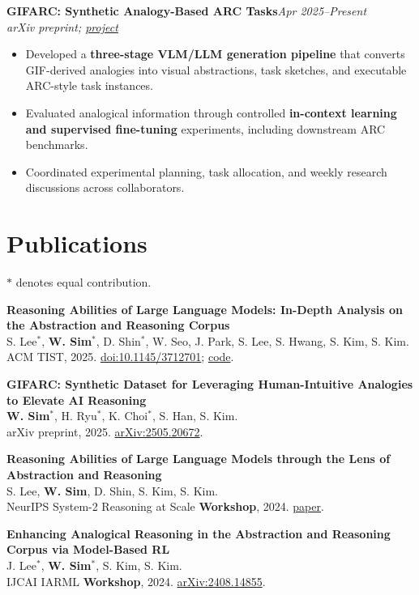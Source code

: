 \documentclass[10pt,a4paper]{article}
\newcommand{\entry}[3]{\textbf{#1}\hfill\textit{#2}\\\textit{#3}\par}
\newcommand{\pub}[2]{\noindent #1\\{\small #2}\par\vspace{2pt}}
\begin{document}
\entry{GIFARC: Synthetic Analogy-Based ARC Tasks}{Apr 2025--Present}{arXiv preprint; \href{https://gifarc.vercel.app/}{project}}
\begin{itemize}
  \item Developed a \textbf{three-stage VLM/LLM generation pipeline} that converts GIF-derived
  analogies into visual abstractions, task sketches, and executable ARC-style task instances.
  \item Evaluated analogical information through controlled \textbf{in-context learning and
  supervised fine-tuning} experiments, including downstream ARC benchmarks.
  \item Coordinated experimental planning, task allocation, and weekly research
  discussions across collaborators.
\end{itemize}

\newpage
\section{Publications}
{\small $*$ denotes equal contribution.\par}
\pub{\textbf{Reasoning Abilities of Large Language Models: In-Depth Analysis on the Abstraction and Reasoning Corpus}}
{S. Lee$^*$, \textbf{W. Sim}$^*$, D. Shin$^*$, W. Seo, J. Park, S. Lee, S. Hwang, S. Kim, S. Kim.\\
ACM TIST, 2025. \href{https://doi.org/10.1145/3712701}{doi:10.1145/3712701};
\href{https://github.com/GIST-DSLab/ARC_Prompt}{code}.}

\pub{\textbf{GIFARC: Synthetic Dataset for Leveraging Human-Intuitive Analogies to Elevate AI Reasoning}}
{\textbf{W. Sim}$^*$, H. Ryu$^*$, K. Choi$^*$, S. Han, S. Kim.\\
arXiv preprint, 2025. \href{https://arxiv.org/abs/2505.20672}{arXiv:2505.20672}.}

\pub{\textbf{Reasoning Abilities of Large Language Models through the Lens of Abstraction and Reasoning}}
{S. Lee, \textbf{W. Sim}, D. Shin, S. Kim, S. Kim.\\
NeurIPS System-2 Reasoning at Scale \textbf{Workshop}, 2024.
\href{https://openreview.net/forum?id=getEDedhSV}{paper}.}

\pub{\textbf{Enhancing Analogical Reasoning in the Abstraction and Reasoning Corpus via Model-Based RL}}
{J. Lee$^*$, \textbf{W. Sim}$^*$, S. Kim, S. Kim.\\
IJCAI IARML \textbf{Workshop}, 2024. \href{https://arxiv.org/abs/2408.14855}{arXiv:2408.14855}.}
\end{document}
